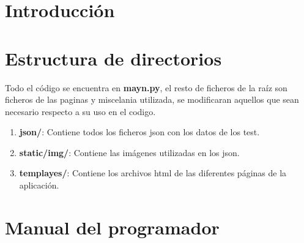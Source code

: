 
\section{Introducción}

\section{Estructura de directorios}
Todo el código se encuentra en \textbf{mayn.py}, el resto de ficheros de la raíz son ficheros de las paginas y miscelania utilizada, se modificaran aquellos que sean necesario respecto a su uso en el codigo.
\begin{enumerate}
    \item \textbf{json/}: Contiene todos los ficheros json con los datos de los test.
    \item \textbf{static/img/}: Contiene las imágenes utilizadas en los json.
    \item \textbf{templayes/}: Contiene los archivos html de las diferentes páginas de la aplicación.
\end{enumerate}
\section{Manual del programador}

